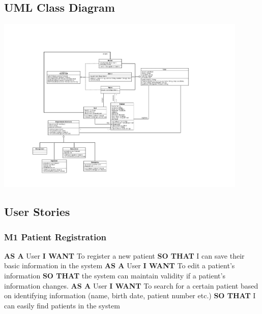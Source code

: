 \subsection{UML Class Diagram}
%
\includegraphics[width=0.9\textwidth]{Figures/ClassDiagram}
%
\subsection{User Stories}
%
\subsubsection*{M1 Patient Registration}
%
\textbf{AS A} User\hfill \break
\textbf{I WANT} To register a new patient\hfill \break
\textbf{SO THAT} I can save their basic information in the system\hfill \medbreak
%
\textbf{AS A} User\hfill \break
\textbf{I WANT} To edit a patient's information\hfill \break
\textbf{SO THAT} the system can maintain validity if a patient's information changes.\hfill \medbreak
%
\textbf{AS A} User\hfill \break
\textbf{I WANT} To search for a certain patient based on identifying information (name, birth date, patient number etc.)\hfill \break
\textbf{SO THAT} I can easily find patients in the system\hfill \medbreak
%
